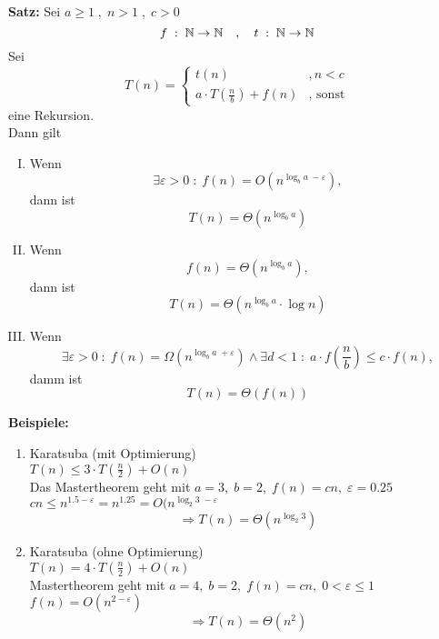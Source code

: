 \begin{description}

\item{\bfseries Satz:} Sei $a \geq 1 \; , \; n > 1 \; , \; c>0$\\
$$
f \; : \; \mathbb{N} \rightarrow \mathbb{N} \quad , \quad t \; : \; \mathbb{N} \rightarrow \mathbb{N}
$$
Sei
$$
T(n) = \left\{
\begin{array}{lr}
t(n) & , n < c\\
a \cdot T(\frac{n}{b}) + f(n) & \text{, sonst}
\end{array}
\right.
$$
eine Rekursion.\\
Dann gilt

\begin{enumerate}[(I)]

\item Wenn
$$
\exists \varepsilon > 0 \; : \; f(n) = O\left( n^{\log_b a \; - \varepsilon} \right),
$$
dann ist
$$
T(n) = \Theta \left( n^{\log_b a} \right)
$$

\item Wenn
$$
f(n) = \Theta \left( n^{\log_b a} \right),
$$
dann ist
$$
T(n) = \Theta \left( n^{\log_b a} \cdot \log n \right)
$$

\item Wenn
$$
\exists \varepsilon > 0 \; : \; f(n) = \Omega \left( n^{\log_b a \; + \varepsilon} \right) \land \exists d < 1 \; : \; a\cdot f\left( \frac{n}{b} \right) \leq c \cdot f(n),
$$
damm ist
$$
T(n) = \Theta \left( f(n) \right)
$$

\end{enumerate}

\item{\bfseries Beispiele:}

\begin{enumerate}[\bfseries (1)]

\item Karatsuba (mit Optimierung)\\
$T(n) \leq 3 \cdot T( \frac{n}{2} ) + O(n)$\\
Das Mastertheorem geht mit $a = 3, \; b=2,\; f(n) = cn,\; \varepsilon  = 0.25$\\
$cn \leq n^{1.5 - \varepsilon} = n^{1.25} = O(n^{\log_2 3 \; - \varepsilon}$
$$
\Rightarrow T(n) = \Theta \left( n^{\log_2 3} \right)
$$

\item Karatsuba (ohne Optimierung)\\
$T(n) = 4 \cdot T(\frac{n}{2} ) + O(n)$\\
Mastertheorem geht mit $a=4, \; b=2, \; f(n) = cn, \; 0 < \varepsilon \leq 1$\\
$f(n) = O(n^{2 - \varepsilon})$
$$
\Rightarrow T(n) = \Theta (n^2)
$$


\end{enumerate}
\end{description}
